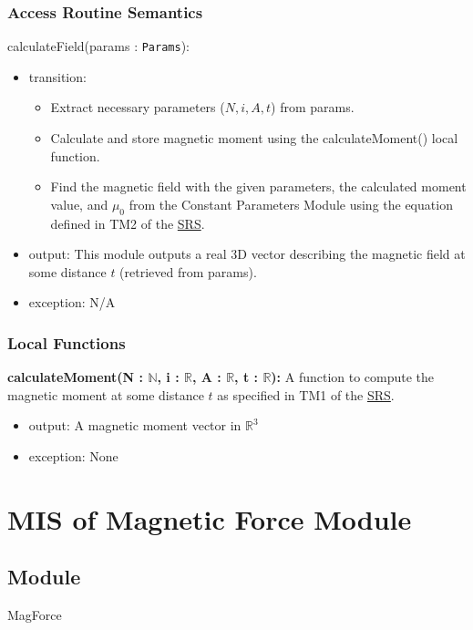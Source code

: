 \documentclass[12pt, titlepage]{article}
\begin{document}
\subsubsection{Access Routine Semantics}

\noindent calculateField(params : \texttt{Params}):
\begin{itemize}
\item transition:
\begin{itemize}
  \item Extract necessary parameters ($N, i, A, t$) from params. 
  \item Calculate and store magnetic moment using the calculateMoment() local function.
  \item Find the magnetic field with the given parameters, the calculated moment value, and $\mu_0$ from the Constant Parameters Module using the equation defined in TM2 of the \href{https://github.com/husseinsd1/optimal-em-arrangement/blob/main/docs/SRS/SRS.pdf}{SRS}. 
\end{itemize}
\item output: This module outputs a real 3D vector describing the magnetic field at some distance $t$ (retrieved from params).
\item exception: N/A
\end{itemize}

\subsubsection{Local Functions}
\textbf{calculateMoment(N : $\mathbb{N}$, i : $\mathbb{R}$, A : $\mathbb{R}$, t : $\mathbb{R}$):} A function to compute the magnetic moment at some distance $t$ as specified in TM1 of the \href{https://github.com/husseinsd1/optimal-em-arrangement/blob/main/docs/SRS/SRS.pdf}{SRS}.
\begin{itemize}
  \item output: A magnetic moment vector in $\mathbb{R}^3$
  \item exception: None
\end{itemize}

\newpage

\section{MIS of Magnetic Force Module} \label{MISMagForce}

\subsection{Module}
MagForce 
\end{document}
